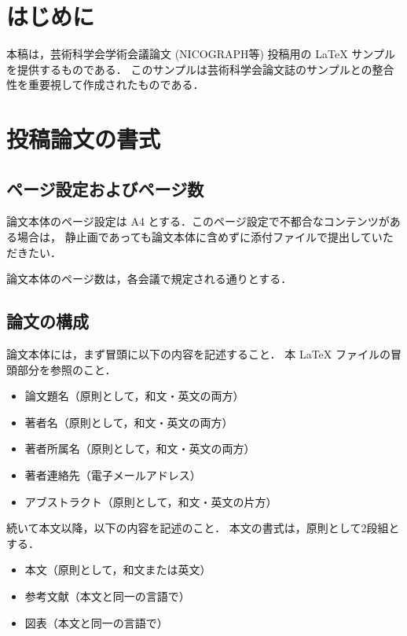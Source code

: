 \documentclass[a4paper,twocolumn,dvipdfmx,uplatex]{jsarticle} %
\begin{document}
\maketitle
\thispagestyle{aspagestyle}

\section{はじめに}

本稿は，芸術科学会学術会議論文 (NICOGRAPH等) 投稿用の LaTeX サンプルを提供するものである．
このサンプルは芸術科学会論文誌のサンプルとの整合性を重要視して作成されたものである．

\section{投稿論文の書式}

\subsection{ページ設定およびページ数}

論文本体のページ設定は A4 とする．このページ設定で不都合なコンテンツがある場合は，
静止画であっても論文本体に含めずに添付ファイルで提出していただきたい．

論文本体のページ数は，各会議で規定される通りとする．

\subsection{論文の構成}

論文本体には，まず冒頭に以下の内容を記述すること．
本 LaTeX ファイルの冒頭部分を参照のこと．

\begin{itemize}
\item 論文題名（原則として，和文・英文の両方）
\item 著者名（原則として，和文・英文の両方）
\item 著者所属名（原則として，和文・英文の両方）
\item 著者連絡先（電子メールアドレス）
\item アブストラクト（原則として，和文・英文の片方）
\end{itemize}
続いて本文以降，以下の内容を記述のこと．
本文の書式は，原則として2段組とする． 
\begin{itemize}
\item 本文（原則として，和文または英文）
\item 参考文献（本文と同一の言語で）
\item 図表（本文と同一の言語で）
\end{itemize}
\end{document}
